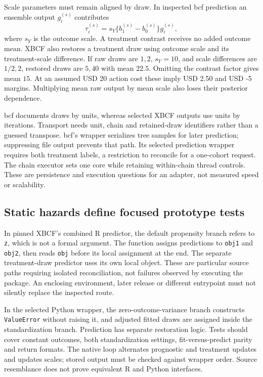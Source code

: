 Scale parameters must remain aligned by draw. In inspected bcf prediction an ensemble output $g_i^{(s)}$ contributes
\begin{equation}
 \tau_i^{(s)}=s_Y\{b_1^{(s)}-b_0^{(s)}\}g_i^{(s)},
 \label{exec21:cxx-restore}
\end{equation}
where $s_Y$ is the outcome scale. A treatment contrast receives no added outcome mean. XBCF also restores a treatment draw using outcome scale and its treatment-scale difference. If raw draws are $1,2$, $s_Y=10$, and scale differences are $1/2,2$, restored draws are $5,40$ with mean $22.5$. Omitting the contrast factor gives mean $15$. At an assumed USD 20 action cost these imply USD 2.50 and USD -5 margins. Multiplying mean raw output by mean scale also loses their posterior dependence.\citep{exec21_cxx_bcf,exec21_cxx_xbcf,exec21_cxx_reference}

bcf documents draws by units, whereas selected XBCF outputs use units by iterations. Transport needs unit, chain and retained-draw identifiers rather than a guessed transpose. bcf's wrapper serializes tree samples for later prediction; suppressing file output prevents that path. Its selected prediction wrapper requires both treatment labels, a restriction to reconcile for a one-cohort request. The chain executor sets one core while retaining within-chain thread controls. These are persistence and execution questions for an adapter, not measured speed or scalability.\citep{exec21_cxx_bcf,exec21_cxx_xbcf}

\subsection{Static hazards define focused prototype tests}
\label{exec21:cxx-hazards}
In pinned XBCF's combined R predictor, the default propensity branch refers to \texttt{z}, which is not a formal argument. The function assigns predictions to \texttt{obj1} and \texttt{obj2}, then reads \texttt{obj} before its local assignment at the end. The separate treatment-draw predictor uses its own local object. These are particular source paths requiring isolated reconciliation, not failures observed by executing the package. An enclosing environment, later release or different entrypoint must not silently replace the inspected route.\citep{exec21_cxx_xbcf}

In the selected Python wrapper, the zero-outcome-variance branch constructs \texttt{ValueError} without raising it, and adjusted fitted draws are assigned inside the standardization branch. Prediction has separate restoration logic. Tests should cover constant outcomes, both standardization settings, fit-versus-predict parity and return formats. The native loop alternates prognostic and treatment updates and updates scales; stored output must be checked against wrapper order. Source resemblance does not prove equivalent R and Python interfaces.\citep{exec21_cxx_xbcf}


